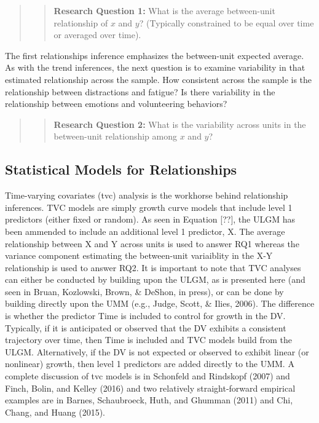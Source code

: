 \documentclass[english,,man]{apa6}
\theoremstyle{definition}
\theoremstyle{definition}
\theoremstyle{definition}
\theoremstyle{remark}
\begin{document}
\begin{quote}
\begin{quote}
\textbf{Research Question 1:} What is the average between-unit
relationship of \(x\) and \(y\)? (Typically constrained to be equal over
time or averaged over time).
\end{quote}
\end{quote}

The first relationships inference emphasizes the between-unit expected
average. As with the trend inferences, the next question is to examine
variability in that estimated relationship across the sample. How
consistent across the sample is the relationship between distractions
and fatigue? Is there variability in the relationship between emotions
and volunteering behaviors?

\begin{quote}
\begin{quote}
\textbf{Research Question 2:} What is the variability across units in
the between-unit relationship among \(x\) and \(y\)?
\end{quote}
\end{quote}

\hypertarget{statistical-models-for-relationships}{%
\subsection{Statistical Models for
Relationships}\label{statistical-models-for-relationships}}

Time-varying covariates (tvc) analysis is the workhorse behind
relationship inferences. TVC models are simply growth curve models that
include level 1 predictors (either fixed or random). As seen in Equation
{[}??{]}, the ULGM has been ammended to include an additional level 1
predictor, X. The average relationship between X and Y across units is
used to answer RQ1 whereas the variance component estimating the
between-unit variaiblity in the X-Y relationship is used to answer RQ2.
It is important to note that TVC analyses can either be conducted by
building upon the ULGM, as is presented here (and seen in Bruan,
Kozlowski, Brown, \& DeShon, in press), or can be done by building
directly upon the UMM (e.g., Judge, Scott, \& Ilies, 2006). The
difference is whether the predictor Time is included to control for
growth in the DV. Typically, if it is anticipated or observed that the
DV exhibits a consistent trajectory over time, then Time is included and
TVC models build from the ULGM. Alternatively, if the DV is not expected
or observed to exhibit linear (or nonlinear) growth, then level 1
predictors are added directly to the UMM. A complete discussion of tvc
models is in Schonfeld and Rindskopf (2007) and Finch, Bolin, and Kelley
(2016) and two relatively straight-forward empirical examples are in
Barnes, Schaubroeck, Huth, and Ghumman (2011) and Chi, Chang, and Huang
(2015).
\end{document}
